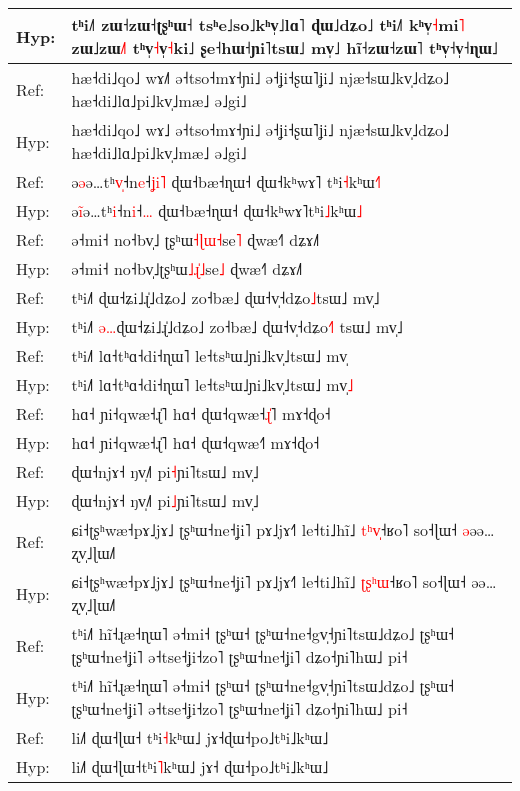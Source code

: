 \documentclass[10pt]{article}
\DeclareRobustCommand{\hl}[1]{{\textcolor{red}{#1}}}
\begin{document}
\begin{longtable}{ll}
Hyp: & tʰi˩˥ zɯ˧zɯ˧ʈʂʰɯ˧ tsʰe˩so˩kʰv̩˩lɑ˥\hl{ }ɖɯ˩dʑo˩ tʰi˩˥ kʰv̩\hl{˧}mi\hl{˥}\hl{ }zɯ˩zɯ\hl{˩}˥\hl{ }tʰv̩\hl{˧}v̩\hl{˧}ki˩ ʂe˧hɯ˧ɲi˥tsɯ˩ mv̩˩ hĩ˧zɯ˧zɯ˥ tʰv̩˧v̩˧ɳɯ˩ \\ 
\midrule 
Ref: & hæ˧di˩qo˩ wɤ˩\hl{˥} ə˧tso˧mɤ˧ɲi˩ ə˧ʝi˧ʂɯ˥ʝi˩ njæ˧sɯ˩kv̩˩dʑo˩ hæ˧di˩lɑ˩pi˩kv̩˩mæ˩ ə˩gi˩ \\ 
Hyp: & hæ˧di˩qo˩ wɤ˩ ə˧tso˧mɤ˧ɲi˩ ə˧ʝi˧ʂɯ˥ʝi˩ njæ˧sɯ˩kv̩˩dʑo˩ hæ˧di˩lɑ˩pi˩kv̩˩mæ˩ ə˩gi˩ \\ 
\midrule 
Ref: & ə\hl{ə}ə…tʰ\hl{v}\hl{̩}˧n\hl{e}˧\hl{ʝ}\hl{i}\hl{˥} ɖɯ˧bæ˧ɳɯ˧ ɖɯ˧kʰwɤ˥\hl{ }tʰi\hl{˧}kʰɯ\hl{˧}\hl{˥} \\ 
Hyp: & ə\hl{i}\hl{̃}ə…tʰ\hl{i}˧n\hl{i}˧\hl{…} ɖɯ˧bæ˧ɳɯ˧ ɖɯ˧kʰwɤ˥tʰi\hl{˩}kʰɯ\hl{˩} \\ 
\midrule 
Ref: & ə˧mi˧ no˧bv̩˩\hl{ }ʈʂʰɯ\hl{˧}\hl{ɭ}\hl{ɯ}\hl{˧}se\hl{˥} ɖwæ˧˥ dʑɤ˩˥ \\ 
Hyp: & ə˧mi˧ no˧bv̩˩ʈʂʰɯ\hl{˩}\hl{ɻ}\hl{̍}\hl{˩}se\hl{˩} ɖwæ˧˥ dʑɤ˩˥ \\ 
\midrule 
Ref: & tʰi˩˥ ɖɯ˧ʑi˩ɻ̍˩dʑo˩ zo˧bæ˩ ɖɯ˧v̩˧dʑo\hl{˩}tsɯ˩ mv̩˩ \\ 
Hyp: & tʰi˩˥ \hl{ə}\hl{…}ɖɯ˧ʑi˩ɻ̍˩dʑo˩ zo˧bæ˩ ɖɯ˧v̩˧dʑo\hl{˧}\hl{˥}\hl{ }tsɯ˩ mv̩˩ \\ 
\midrule 
Ref: & tʰi˩˥ lɑ˧tʰɑ˧di˧ɳɯ˥ le˧tsʰɯ˩ɲi˩kv̩˩tsɯ˩ mv̩ \\ 
Hyp: & tʰi˩˥ lɑ˧tʰɑ˧di˧ɳɯ˥ le˧tsʰɯ˩ɲi˩kv̩˩tsɯ˩ mv̩\hl{˩} \\ 
\midrule 
Ref: & hɑ˧ ɲi˧qwæ˧ɻ̍˥ hɑ˧ ɖɯ˧qwæ˧\hl{ɻ}\hl{̍}˥ mɤ˧ɖo˧ \\ 
Hyp: & hɑ˧ ɲi˧qwæ˧ɻ̍˥ hɑ˧ ɖɯ˧qwæ˧˥ mɤ˧ɖo˧ \\ 
\midrule 
Ref: & ɖɯ˧njɤ˧ ŋv̩˩˥ pi\hl{˧}ɲi˥tsɯ˩ mv̩˩ \\ 
Hyp: & ɖɯ˧njɤ˧ ŋv̩˩˥ pi\hl{˩}ɲi˥tsɯ˩ mv̩˩ \\ 
\midrule 
Ref: & ɕi˧ʈʂʰwæ˧pɤ˩jɤ˩ ʈʂʰɯ˧ne˧ʝi˥ pɤ˩jɤ˧˥ le˧ti˩hĩ˩ \hl{t}\hl{ʰ}\hl{v}\hl{̩}˧ʁo˥ so˧ɭɯ˧ \hl{ə}əə…ʐv̩˩ɭɯ˩˥ \\ 
Hyp: & ɕi˧ʈʂʰwæ˧pɤ˩jɤ˩ ʈʂʰɯ˧ne˧ʝi˥ pɤ˩jɤ˧˥ le˧ti˩hĩ˩ \hl{ʈ}\hl{ʂ}\hl{ʰ}\hl{ɯ}˧ʁo˥ so˧ɭɯ˧ əə…ʐv̩˩ɭɯ˩˥ \\ 
\midrule 
Ref: & tʰi˩˥ hĩ˧ɻæ˧ɳɯ˥ ə˧mi˧ ʈʂʰɯ˧ ʈʂʰɯ˧ne˧gv̩˧ɲi˥tsɯ˩dʑo˩ ʈʂʰɯ˧ ʈʂʰɯ˧ne˧ʝi˥ ə˧tse˧ʝi˧zo˥ ʈʂʰɯ˧ne˧ʝi˥ dʑo˧ɲi˥hɯ˩ pi˧ \\ 
Hyp: & tʰi˩˥ hĩ˧ɻæ˧ɳɯ˥ ə˧mi˧ ʈʂʰɯ˧ ʈʂʰɯ˧ne˧gv̩˧ɲi˥tsɯ˩dʑo˩ ʈʂʰɯ˧ ʈʂʰɯ˧ne˧ʝi˥ ə˧tse˧ʝi˧zo˥ ʈʂʰɯ˧ne˧ʝi˥ dʑo˧ɲi˥hɯ˩ pi˧ \\ 
\midrule 
Ref: & li˩˥ ɖɯ˧ɭɯ˧\hl{ }tʰi\hl{˧}kʰɯ˩ jɤ˧ɖɯ˧po˩tʰi˩kʰɯ˩ \\ 
Hyp: & li˩˥ ɖɯ˧ɭɯ˧tʰi\hl{˥}kʰɯ˩ jɤ˧\hl{ }ɖɯ˧po˩tʰi˩kʰɯ˩ \\ 

\end{longtable}
\end{document}
